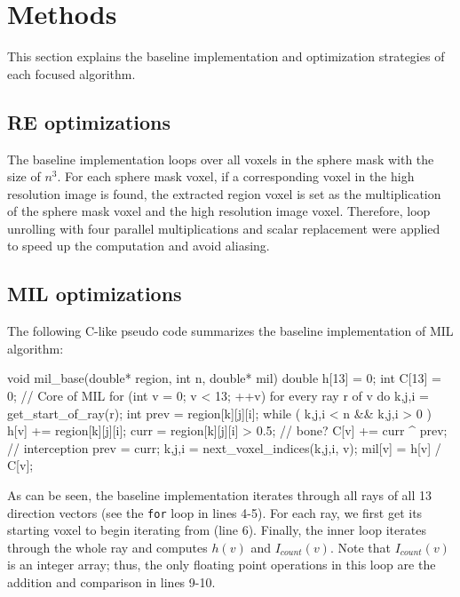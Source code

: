 \documentclass[letterpaper]{article}
\begin{document}
\section{Methods}\label{sec:yourmethod}
This section explains the baseline implementation and optimization strategies of each focused algorithm.

\subsection{RE optimizations} The baseline implementation loops over all voxels in the sphere mask with the size of $n^{3}$. For each sphere mask voxel, if a corresponding voxel in the high resolution image is found, the extracted region voxel is set as the multiplication of the sphere mask voxel and the high resolution image voxel. Therefore, loop unrolling with four parallel multiplications and scalar replacement were applied to speed up the computation and avoid aliasing. 

\subsection{MIL optimizations}
The following C-like pseudo code summarizes the baseline implementation of MIL algorithm:

\begin{ccode}[caption={My Caption},captionpos=b]
void mil_base(double* region, int n, double* mil){
  double h[13] = 0; int C[13] = 0;
  // Core of MIL
  for (int v = 0; v < 13; ++v)
    for every ray r of v  do
      {k,j,i} = get_start_of_ray(r);
      int prev = region[k][j][i];
      while ( {k,j,i} < n && {k,j,i} > 0 )
        h[v] += region[k][j][i];
        curr = region[k][j][i] > 0.5; // bone?
        C[v] += curr ^ prev; // interception
        prev = curr;
        {k,j,i} = next_voxel_indices({k,j,i}, v);
    mil[v] = h[v] / C[v];
 }
\end{ccode}
As can be seen, the baseline implementation iterates through all rays of all 13 direction vectors (see the \texttt{for} loop in lines 4-5). For each ray, we first get its starting voxel to begin iterating from (line 6). Finally, the inner loop iterates through the whole ray and computes $h(v)$ and $I_{count}(v)$. Note that $I_{count}(v)$ is an integer array; thus, the only floating point operations in this loop are the addition and comparison in lines 9-10.
\end{document}
